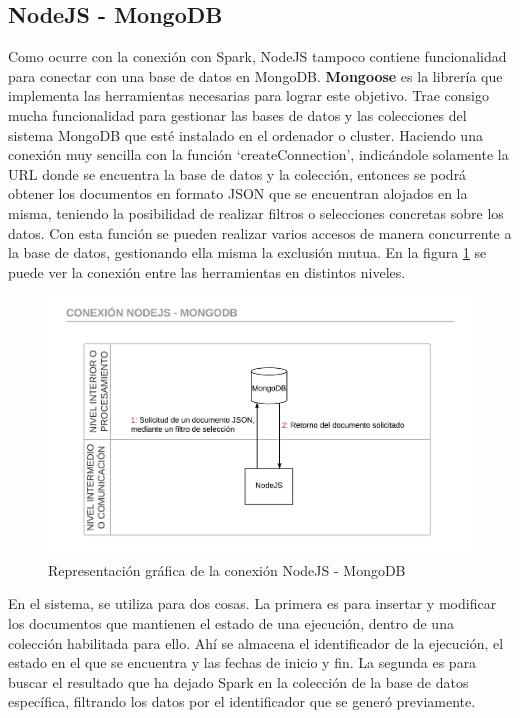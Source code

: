 \subsection{NodeJS - MongoDB}

Como ocurre con la conexión con Spark, NodeJS tampoco contiene funcionalidad para conectar con una base de datos en MongoDB. \textbf{Mongoose} \cite{MongooseInicial} es la librería que implementa las herramientas necesarias para lograr este objetivo. Trae consigo mucha funcionalidad para gestionar las bases de datos y las colecciones del sistema MongoDB que esté instalado en el ordenador o cluster. Haciendo una conexión muy sencilla con la función ‘createConnection’, indicándole solamente la URL donde se encuentra la base de datos y la colección, entonces se podrá obtener los documentos en formato JSON que se encuentran alojados en la misma, teniendo la posibilidad de realizar filtros o selecciones concretas sobre los datos. Con esta función se pueden realizar varios accesos de manera concurrente a la base de datos, gestionando ella misma la exclusión mutua. En la figura \ref{fig:conexionnodejsmongodb} se puede ver la conexión entre las herramientas en distintos niveles.

\begin{figure}
	\centering
	\includegraphics[width=1\linewidth]{imagenes/Conexion_NodeJS_MongoDB}
	\caption{Representación gráfica de la conexión NodeJS - MongoDB}
	\label{fig:conexionnodejsmongodb}
\end{figure}

En el sistema, se utiliza para dos cosas. La primera es para insertar y modificar los documentos que mantienen el estado de una ejecución, dentro de una colección habilitada para ello. Ahí se almacena el identificador de la ejecución, el estado en el que se encuentra y las fechas de inicio y fin. La segunda es para buscar el resultado que ha dejado Spark en la colección de la base de datos específica, filtrando los datos por el identificador que se generó previamente.


